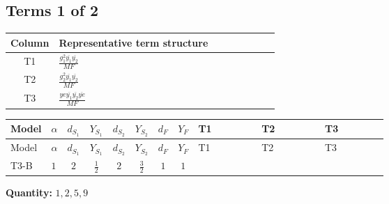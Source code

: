 \documentclass[8pt]{article}
\begin{document}
\begin{landscape}
\subsection*{Terms 1 of 2}
\begin{center}
\begin{tabular}{@{}c >{\raggedright\arraybackslash}p{0.82\linewidth}@{}}
\toprule
Column & Representative term structure \\
\midrule
T1 & \(\displaystyle \frac{g_{1}^{2} \overline{y_{1}} \overline{y_{2}}}{MF}\) \\
\midrule
T2 & \(\displaystyle \frac{g_{2}^{2} \overline{y_{1}} \overline{y_{2}}}{MF}\) \\
\midrule
T3 & \(\displaystyle \frac{ye \overline{y_{1}} \overline{y_{2}} \overline{ye}}{MF}\) \\
\midrule
\bottomrule
\end{tabular}
\end{center}
\smallskip
\tiny
\begin{longtable}{@{}llcccccc >{\raggedright\arraybackslash}p{0.21\linewidth} >{\raggedright\arraybackslash}p{0.21\linewidth} >{\raggedright\arraybackslash}p{0.21\linewidth}@{}}
\toprule
Model & $\alpha$ & $d_{S_1}$ & $Y_{S_1}$ & $d_{S_2}$ & $Y_{S_2}$ & $d_F$ & $Y_F$ & T1 & T2 & T3 \\
\midrule
\endfirsthead
\toprule
Model & $\alpha$ & $d_{S_1}$ & $Y_{S_1}$ & $d_{S_2}$ & $Y_{S_2}$ & $d_F$ & $Y_F$ & T1 & T2 & T3 \\
\midrule
\endhead
T3-B & $1$ & $2$ & $\frac{1}{2}$ & $2$ & $\frac{3}{2}$ & $1$ & $1$ & \scriptsize\adjustbox{max width=\linewidth}{$\begin{gathered} \frac{3 g_{1}^{2} \overline{y_{1}} \overline{y_{2}}}{4 MF}\end{gathered}$} & \scriptsize\adjustbox{max width=\linewidth}{$\begin{gathered} \frac{3 g_{2}^{2} \overline{y_{1}} \overline{y_{2}}}{8 MF}\end{gathered}$} & \scriptsize\adjustbox{max width=\linewidth}{$\begin{gathered} - \frac{ye \overline{y_{1}} \overline{y_{2}} \overline{ye}}{8 MF}\end{gathered}$} \\
\midrule
\bottomrule
\end{longtable}
\clearpage
\noindent\textbf{Quantity: }$\mathrm{1,2,5,9}$\par\smallskip

\end{landscape}
\end{document}
